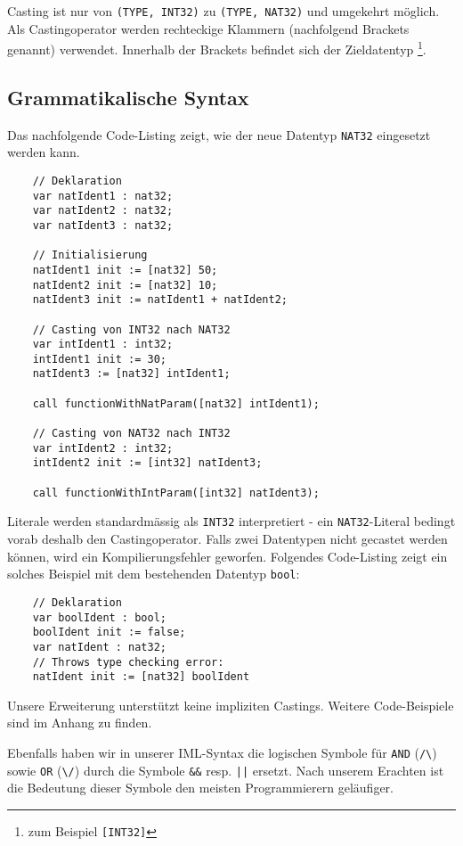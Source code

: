 \documentclass[10pt, a4paper, twocolumn]{article} %
\begin{document}
Casting ist nur von \texttt{(TYPE, INT32)} zu \texttt{(TYPE, NAT32)} und umgekehrt möglich.
Als Castingoperator werden rechteckige Klammern (nachfolgend Brackets genannt) verwendet.
Innerhalb der Brackets befindet sich der Zieldatentyp \footnote{zum Beispiel \texttt{[INT32]}}.

\subsection{Grammatikalische Syntax}
Das nachfolgende Code-Listing zeigt, wie der neue Datentyp \texttt{NAT32} eingesetzt werden kann.
\begin{lstlisting}
    // Deklaration
    var natIdent1 : nat32;
    var natIdent2 : nat32;
    var natIdent3 : nat32;

    // Initialisierung
    natIdent1 init := [nat32] 50;
    natIdent2 init := [nat32] 10;
    natIdent3 init := natIdent1 + natIdent2;

    // Casting von INT32 nach NAT32
    var intIdent1 : int32;
    intIdent1 init := 30;
    natIdent3 := [nat32] intIdent1;

    call functionWithNatParam([nat32] intIdent1);

    // Casting von NAT32 nach INT32
    var intIdent2 : int32;
    intIdent2 init := [int32] natIdent3;

    call functionWithIntParam([int32] natIdent3);
\end{lstlisting}
Literale werden standardmässig als \texttt{INT32} interpretiert - ein \texttt{NAT32}-Literal bedingt vorab deshalb den Castingoperator.
Falls zwei Datentypen nicht gecastet werden können, wird ein Kompilierungsfehler geworfen.
Folgendes Code-Listing zeigt ein solches Beispiel mit dem bestehenden Datentyp \texttt{bool}:
\begin{lstlisting}
    // Deklaration
    var boolIdent : bool;
    boolIdent init := false;
    var natIdent : nat32;
    // Throws type checking error:
    natIdent init := [nat32] boolIdent
\end{lstlisting}
Unsere Erweiterung unterstützt keine impliziten Castings.
Weitere Code-Beispiele sind im Anhang zu finden.

Ebenfalls haben wir in unserer IML-Syntax die logischen Symbole für \texttt{AND} (\texttt{/\textbackslash{}}) sowie \texttt{OR} (\texttt{\textbackslash{}/}) durch die Symbole \texttt{\&\&} resp. \texttt{||} ersetzt.
Nach unserem Erachten ist die Bedeutung dieser Symbole den meisten Programmierern geläufiger.
\end{document}
